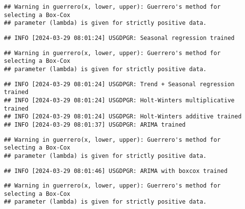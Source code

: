 \documentclass[
]{article}
\begin{document}
\begin{verbatim}
## Warning in guerrero(x, lower, upper): Guerrero's method for selecting a Box-Cox
## parameter (lambda) is given for strictly positive data.
\end{verbatim}

\begin{verbatim}
## INFO [2024-03-29 08:01:24] USGDPGR: Seasonal regression trained
\end{verbatim}

\begin{verbatim}
## Warning in guerrero(x, lower, upper): Guerrero's method for selecting a Box-Cox
## parameter (lambda) is given for strictly positive data.
\end{verbatim}

\begin{verbatim}
## INFO [2024-03-29 08:01:24] USGDPGR: Trend + Seasonal regression trained
## INFO [2024-03-29 08:01:24] USGDPGR: Holt-Winters multiplicative trained
## INFO [2024-03-29 08:01:24] USGDPGR: Holt-Winters additive trained
## INFO [2024-03-29 08:01:37] USGDPGR: ARIMA trained
\end{verbatim}

\begin{verbatim}
## Warning in guerrero(x, lower, upper): Guerrero's method for selecting a Box-Cox
## parameter (lambda) is given for strictly positive data.
\end{verbatim}

\begin{verbatim}
## INFO [2024-03-29 08:01:46] USGDPGR: ARIMA with boxcox trained
\end{verbatim}

\begin{verbatim}
## Warning in guerrero(x, lower, upper): Guerrero's method for selecting a Box-Cox
## parameter (lambda) is given for strictly positive data.
\end{verbatim}
\end{document}
